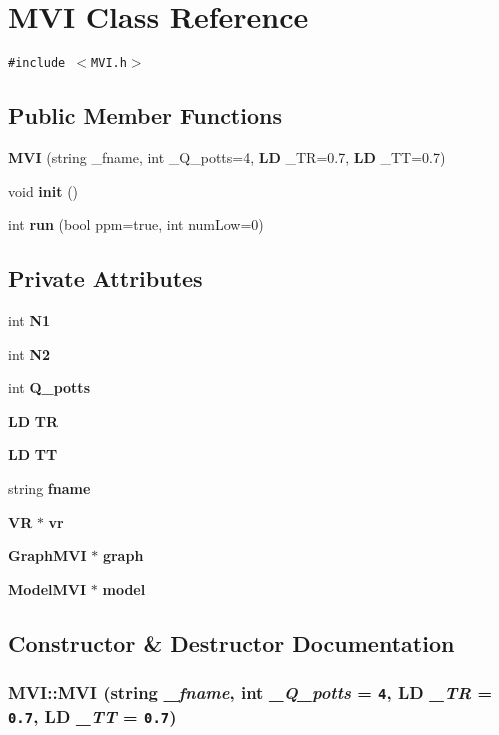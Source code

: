 \section{MVI Class Reference}
\label{classMVI}
{\tt \#include $<$MVI.h$>$}

\subsection*{Public Member Functions}
\begin{CompactItemize}
\item 
{\bf MVI} (string \_\-fname, int \_\-Q\_\-potts=4, {\bf LD} \_\-TR=0.7, {\bf LD} \_\-TT=0.7)
\item 
void {\bf init} ()
\item 
int {\bf run} (bool ppm=true, int numLow=0)
\end{CompactItemize}
\subsection*{Private Attributes}
\begin{CompactItemize}
\item 
int {\bf N1}
\item 
int {\bf N2}
\item 
int {\bf Q\_\-potts}
\item 
{\bf LD} {\bf TR}
\item 
{\bf LD} {\bf TT}
\item 
string {\bf fname}
\item 
{\bf VR} $\ast$ {\bf vr}
\item 
{\bf GraphMVI} $\ast$ {\bf graph}
\item 
{\bf ModelMVI} $\ast$ {\bf model}
\end{CompactItemize}


\subsection{Constructor \& Destructor Documentation}
\subsubsection{\setlength{\rightskip}{0pt plus 5cm}MVI::MVI (string {\em \_\-fname}, int {\em \_\-Q\_\-potts} = {\tt 4}, {\bf LD} {\em \_\-TR} = {\tt 0.7}, {\bf LD} {\em \_\-TT} = {\tt 0.7})\hspace{0.3cm}{\tt  [inline]}}\label{classMVI_16d5d4ef417c5a8c29d36aab7522301f}




